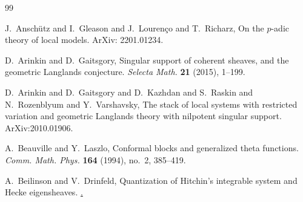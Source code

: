 \documentclass[11pt]{amsart}
\theoremstyle{definition}
\theoremstyle{definition}
\theoremstyle{definition}
\numberwithin{equation}{section}
\begin{document}
\begin{thebibliography}{99}







J.~Ansch\"utz and I.~Gleason and J.~Louren\c{c}o and T.~Richarz, On the $p$-adic theory of local models. ArXiv: 2201.01234.

D.~Arinkin and D.~Gaitsgory, Singular support of coherent sheaves, and the geometric Langlands conjecture. \emph{Selecta Math.} \textbf{21} (2015), 1--199.

D.~Arinkin and D.~Gaitsgory and D.~Kazhdan and S.~Raskin and N.~Rozenblyum and Y.~Varshavsky, The stack of local systems with restricted variation and geometric Langlands theory with nilpotent singular support. ArXiv:2010.01906.

A.~Beauville and Y.~Laszlo, Conformal blocks and generalized theta functions. \emph{Comm. Math. Phys.} \textbf{164} (1994), no.~2, 385--419. 

A.~Beilinson and V.~Drinfeld, Quantization of Hitchin's integrable system and Hecke eigensheaves. \href{www.math.uchicago.edu/~mitya/langlands}.


\end{thebibliography}
\end{document}
